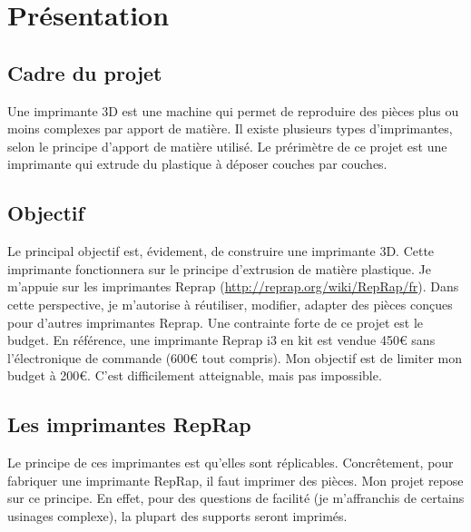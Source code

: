\section{Présentation}
\subsection{Cadre du projet}
Une imprimante 3D est une machine qui permet de reproduire des pièces %
plus ou moins complexes par apport de matière. Il existe plusieurs types %
d'imprimantes, selon le principe d'apport de matière utilisé. Le prérimètre %
de ce projet est une imprimante qui extrude du plastique à déposer couches %
par couches.
%
\subsection{Objectif}
Le principal objectif est, évidement, de construire une imprimante 3D. Cette %
imprimante fonctionnera sur le principe d'extrusion de matière plastique. Je %
m'appuie sur les imprimantes Reprap (\url{http://reprap.org/wiki/RepRap/fr}). %
Dans cette perspective, je m'autorise à réutiliser, modifier, adapter des pièces %
conçues pour d'autres imprimantes Reprap.%
%
Une contrainte forte de ce projet est le budget. En référence, une imprimante %
Reprap i3 en kit est vendue 450\euro{} sans l'électronique de commande (600\euro{} tout %
compris). Mon objectif est de limiter mon budget à 200\euro{}. C'est difficilement %
atteignable, mais pas impossible.
%
\subsection{Les imprimantes RepRap}
Le principe de ces imprimantes est qu'elles sont réplicables. Concrêtement, %
pour fabriquer une imprimante RepRap, il faut imprimer des pièces. Mon projet %
repose sur ce principe. En effet, pour des questions de facilité (je m'affranchis %
de certains usinages complexe), la plupart des supports seront imprimés.